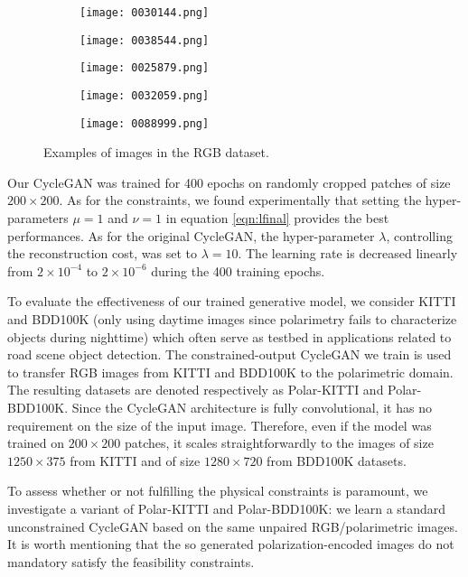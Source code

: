 \begin{figure}
	\centering
	\begin{subfigure}{.2\textwidth}
		\centering
		\texttt{[image: 0030144.png]}
	\end{subfigure}%
	\begin{subfigure}{.2\textwidth}
		\centering
		\texttt{[image: 0038544.png]}
	\end{subfigure}%
	\begin{subfigure}{.2\textwidth}
		\centering
		\texttt{[image: 0025879.png]}
	\end{subfigure}%
	\begin{subfigure}{.2\textwidth}
		\centering
		\texttt{[image: 0032059.png]}
	\end{subfigure}%
	\begin{subfigure}{.2\textwidth}
		\centering
		\texttt{[image: 0088999.png]}
	\end{subfigure}
	\caption{Examples of images in the RGB dataset.}
	\label{fig:rgb_example}
\end{figure}

Our CycleGAN was trained for 400 epochs on randomly cropped patches of size $200\times 200$. As for the constraints, we found experimentally that setting the hyper-parameters $\mu = 1$ and $\nu = 1$ in equation \eqref{eqn:lfinal} provides the best performances. As for the original CycleGAN, the hyper-parameter $\lambda$, controlling the reconstruction cost,
was set to $\lambda = 10$. The learning rate is decreased linearly from $2 \times 10^{-4}$ to $2 \times 10^{-6}$ during the 400 training epochs.

To evaluate the effectiveness of our trained generative model, we consider KITTI and BDD100K (only using daytime images since polarimetry fails to characterize objects during nighttime) which often serve as testbed in applications related to road scene object detection. The constrained-output CycleGAN we train is used to transfer RGB images from KITTI and BDD100K to the polarimetric domain. The resulting datasets are denoted respectively as Polar-KITTI and Polar-BDD100K. Since the CycleGAN architecture is fully convolutional, it has no requirement on the size of the input image. Therefore, even if the model was trained on $200 \times 200$ patches, it scales straightforwardly to the images of size $1250 \times 375$ from KITTI and of size $1280 \times 720$ from BDD100K datasets.

To assess whether or not fulfilling the physical  constraints is paramount, we investigate a variant of Polar-KITTI and Polar-BDD100K: we learn a standard unconstrained CycleGAN based on the same unpaired RGB/polarimetric images. It is worth mentioning that the so generated polarization-encoded images do not mandatory satisfy the feasibility constraints. 

